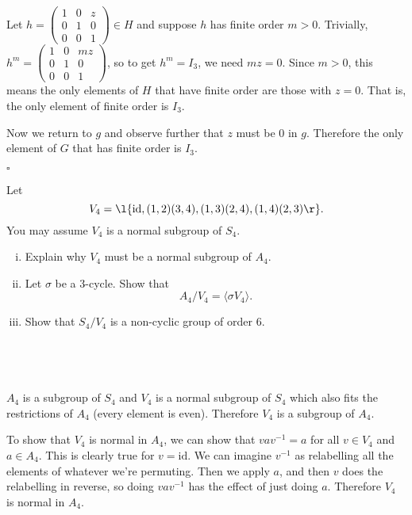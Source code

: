 \documentclass[a4paper]{article}
\begin{document}
Let $h = \begin{pmatrix} 1 & 0 & z \\ 0 & 1 & 0 \\ 0 & 0 & 1 \end{pmatrix} \in H$ and suppose $h$ has finite order $m > 0$. Trivially, $h^m = \begin{pmatrix} 1 & 0 & mz \\ 0 & 1 & 0 \\ 0 & 0 & 1 \end{pmatrix}$, so to get $h^m = I_3$, we need $mz = 0$. Since $m > 0$, this means the only elements of $H$ that have finite order are those with $z = 0$. That is, the only element of finite order is $I_3$.

Now we return to $g$ and observe further that $z$ must be 0 in $g$. Therefore the only element of $G$ that has finite order is $I_3$.

\hfill $\square$



\begin{questionbody}
Let \[
V_4 = \l\{ \mathrm{id}, (1,2)(3,4), (1,3)(2,4), (1,4)(2,3) \r\}.
\] You may assume $V_4$ is a normal subgroup of $S_4$.
%
\begin{enumerate}[(i)]
\item Explain why $V_4$ must be a normal subgroup of $A_4$.

\item Let $\sigma$ be a 3-cycle. Show that \[ A_4 / V_4 = \langle \sigma V_4 \rangle . \]

\item Show that $S_4 / V_4$ is a non-cyclic group of order 6.
\end{enumerate}
\end{questionbody}

\subsection{~} %

$A_4$ is a subgroup of $S_4$ and $V_4$ is a normal subgroup of $S_4$ which also fits the restrictions of $A_4$ (every element is even). Therefore $V_4$ is a subgroup of $A_4$.

To show that $V_4$ is normal in $A_4$, we can show that $v a v^{-1} = a$ for all $v \in V_4$ and $a \in A_4$. This is clearly true for $v = \mathrm{id}$. We can imagine $v^{-1}$ as relabelling all the elements of whatever we're permuting. Then we apply $a$, and then $v$ does the relabelling in reverse, so doing $v a v^{-1}$ has the effect of just doing $a$. Therefore $V_4$ is normal in $A_4$.
\end{document}
